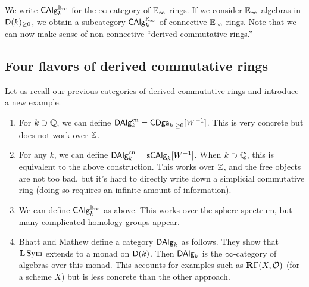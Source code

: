 \documentclass{amsart}
\begin{document}
We write $\mathsf{CAlg}_k^{\mathbb{E}_\infty}$ for the $\infty$-category of $\mathbb{E}_\infty$-rings.
If we consider $\mathbb{E}_\infty$-algebras in $\mathsf{D}(k)_{\geq 0}$, we obtain a subcategory $\mathsf{CAlg}_k^{\mathbb{E}_\infty}$ of connective $\mathbb{E}_\infty$-rings.
Note that we can now make sense of non-connective ``derived commutative rings.''

\subsection{Four flavors of derived commutative rings}

Let us recall our previous categories of derived commutative rings and introduce a new example.
\begin{enumerate}
	\item For $k \supset \mathbb{Q}$, we can define $\mathsf{DAlg}_k^{\mathrm{cn}} = \mathsf{CDga}_{k, \geq 0}[W^{-1}]$.
		This is very concrete but does not work over $\mathbb{Z}$.
	\item For any $k$, we can define $\mathsf{DAlg}_k^{\mathrm{cn}} = \mathsf{s}\mathsf{CAlg}_k[W^{-1}]$.
		When $k \supset \mathbb{Q}$, this is equivalent to the above construction.
		This works over $\mathbb{Z}$, and the free objects are not too bad, but it's hard to directly write down a simplicial commutative ring (doing so requires an infinite amount of information).
	\item We can define $\mathsf{CAlg}_k^{\mathbb{E}_\infty}$ as above.
		This works over the sphere spectrum, but many complicated homology groups appear.
	\item Bhatt and Mathew define a category $\mathsf{DAlg}_k$ as follows.
		They show that $\mathbf{L} \operatorname{Sym}$ extends to a monad on $\mathsf{D}(k)$.
		Then $\mathsf{DAlg}_k$ is the $\infty$-category of algebras over this monad.
		This accounts for examples such as $\mathbf{R} \Gamma(X, \mathcal{O})$ (for a scheme $X$) but is less concrete than the other approach.
\end{enumerate}
\end{document}
